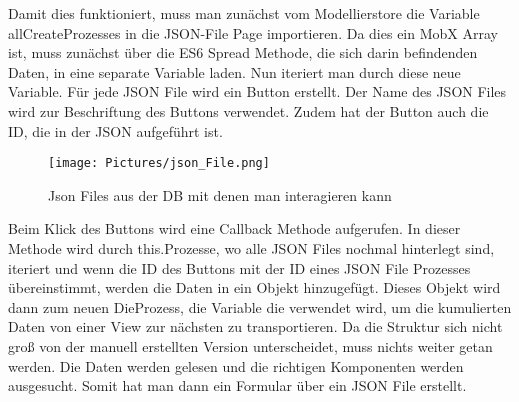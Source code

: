 \documentclass[a4paper,11pt]{scrreprt}
\begin{document}
Damit dies funktioniert, muss man zunächst vom Modellierstore die Variable allCreateProzesses in die JSON-File Page importieren. Da dies ein MobX Array ist, muss zunächst über die ES6 Spread Methode, die sich darin befindenden Daten, in eine separate Variable laden. Nun iteriert man durch diese neue Variable. Für jede JSON File wird ein Button erstellt. Der Name des JSON Files wird zur Beschriftung des Buttons verwendet. 
Zudem hat der Button auch die ID, die in der JSON aufgeführt ist. 
\begin{figure}[ht]
\centering
\texttt{[image: Pictures/json\_File.png]}
\caption{Json Files aus der DB mit denen man interagieren kann}
\label{JSON Files aus der Datenbank}
\end{figure}
\hfill \break

Beim Klick des Buttons wird eine Callback Methode aufgerufen. In dieser Methode wird durch this.Prozesse, wo alle JSON Files nochmal hinterlegt sind, iteriert und wenn die ID des Buttons mit der ID eines JSON File Prozesses übereinstimmt, werden die Daten in ein Objekt hinzugefügt. Dieses Objekt wird dann zum neuen DieProzess, die Variable die verwendet wird, um die kumulierten Daten von einer View zur nächsten zu transportieren. Da die Struktur sich nicht groß von der manuell erstellten Version unterscheidet, muss nichts weiter getan werden. Die Daten werden gelesen und die richtigen Komponenten werden ausgesucht. Somit hat man dann ein Formular über ein JSON File erstellt. 
\end{document}
